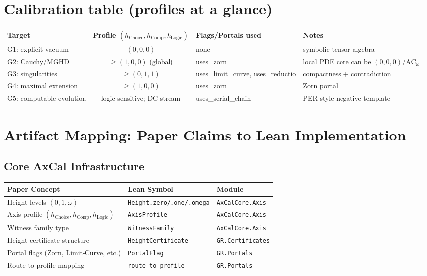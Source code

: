 \documentclass[11pt]{article}
\theoremstyle{definition}
\theoremstyle{remark}
\newcommand{\ACw}{\mathrm{AC}_\omega}
\newcommand{\hChoice}{h_{\mathrm{Choice}}}    %
\newcommand{\hComp}{h_{\mathrm{Comp}}}        %
\newcommand{\hLogic}{h_{\mathrm{Logic}}}      %
\begin{document}
\section{Calibration table (profiles at a glance)}
\begin{center}
\begin{tabular}{|l|c|l|l|}
\hline
\textbf{Target} & \textbf{Profile $(\hChoice,\hComp,\hLogic)$} & \textbf{Flags/Portals used} & \textbf{Notes} \\
\hline
G1: explicit vacuum & $(0,0,0)$ & none & symbolic tensor algebra \\
\hline
G2: Cauchy/MGHD & $\ge(1,0,0)$ (global) & \textsf{uses\_zorn} & local PDE core can be $(0,0,0)$/$\ACw$ \\
\hline
G3: singularities & $\ge(0,1,1)$ & \textsf{uses\_limit\_curve}, \textsf{uses\_reductio} & compactness + contradiction \\
\hline
G4: maximal extension & $\ge(1,0,0)$ & \textsf{uses\_zorn} & Zorn portal \\
\hline
G5: computable evolution & logic-sensitive; DC stream & \textsf{uses\_serial\_chain} & PER-style negative template \\
\hline
\end{tabular}
\end{center}

\section{Artifact Mapping: Paper Claims to Lean Implementation}

\subsection{Core AxCal Infrastructure}

\begin{center}
\small
\begin{tabular}{|p{5cm}|p{5.5cm}|p{4cm}|}
\hline
\textbf{Paper Concept} & \textbf{Lean Symbol} & \textbf{Module} \\
\hline
Height levels $(0, 1, \omega)$ & \texttt{Height.zero/.one/.omega} & \texttt{AxCalCore.Axis} \\
\hline
Axis profile $(\hChoice, \hComp, \hLogic)$ & \texttt{AxisProfile} & \texttt{AxCalCore.Axis} \\
\hline
Witness family type & \texttt{WitnessFamily} & \texttt{AxCalCore.Axis} \\
\hline
Height certificate structure & \texttt{HeightCertificate} & \texttt{GR.Certificates} \\
\hline
Portal flags (Zorn, Limit-Curve, etc.) & \texttt{PortalFlag} & \texttt{GR.Portals} \\
\hline
Route-to-profile mapping & \texttt{route\_to\_profile} & \texttt{GR.Portals} \\
\hline
\end{tabular}
\end{center}
\end{document}
